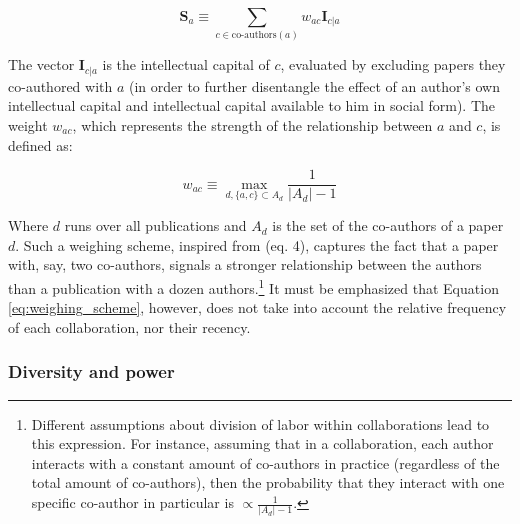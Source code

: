 \documentclass{article}
\begin{document}
\begin{equation}
    \bm{S}_{a} \equiv \sum_{c \in \text{co-authors}(a)} w_{ac} \bm{I}_{c|a}
\end{equation}

The vector $\bm{I}_{c|a}$ is the intellectual capital of $c$, evaluated by excluding papers they co-authored with $a$ (in order to further disentangle the effect of an author's own intellectual capital and intellectual capital available to him in social form). The weight $w_{ac}$, which represents the strength of the relationship between $a$ and $c$, is defined as:

\begin{equation}
    w_{ac} \equiv \max_{d, \{a,c\} \subset A_d} \frac{1}{|A_d|-1}
    \label{eq:weighing_scheme}
\end{equation}

Where $d$ runs over all publications and $A_d$ is the set of the co-authors of a paper $d$. Such a weighing scheme, inspired from \citealt{Newman2004} (eq. 4), captures the fact that a paper with, say, two co-authors, signals a stronger relationship between the authors than a publication with a dozen authors.\footnote{Different assumptions about division of labor within collaborations lead to this expression. For instance, assuming that in a collaboration, each author interacts with a constant amount of co-authors in practice (regardless of the total amount of co-authors), then the probability that they interact with one specific co-author in particular is $\propto \frac{1}{|A_d|-1}$. 
} It must be emphasized that Equation \eqref{eq:weighing_scheme}, however, does not take into account the relative frequency of each collaboration, nor their recency.

\subsubsection{Diversity and power}
\end{document}
